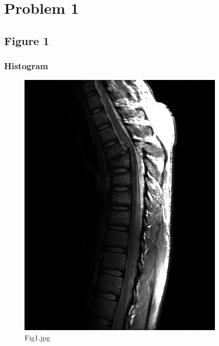 \chapter{Problem 1}

\section{Figure 1}

    \subsection{Histogram}

    \begin{figure}[h]
        \centering
        \includegraphics[width=\linewidth]{./images/Fig1.jpg}
        \caption{Fig1.jpg}
        \label{diagram:fig1}
    \end{figure}

